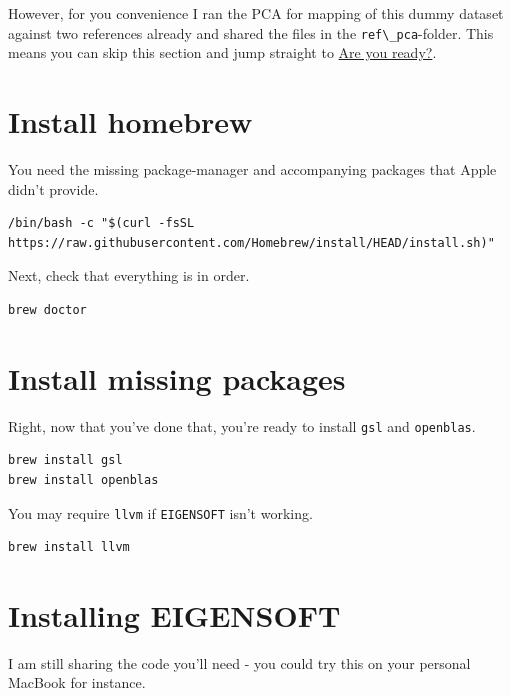 \documentclass[
]{book}
\newcommand{\passthrough}[1]{#1}
\begin{document}
However, for you convenience I ran the PCA for mapping of this dummy dataset against two references already and shared the files in the \passthrough{\lstinline!ref\_pca!}-folder. This means you can skip this section and jump straight to \protect\hyperlink{are-you-ready}{Are you ready?}.

\hypertarget{install-homebrew}{%
\section{Install homebrew}\label{install-homebrew}}

You need the missing package-manager and accompanying packages that Apple didn't provide.

\begin{lstlisting}
/bin/bash -c "$(curl -fsSL https://raw.githubusercontent.com/Homebrew/install/HEAD/install.sh)"
\end{lstlisting}

Next, check that everything is in order.

\begin{lstlisting}
brew doctor
\end{lstlisting}

\hypertarget{install-missing-packages}{%
\section{Install missing packages}\label{install-missing-packages}}

Right, now that you've done that, you're ready to install \passthrough{\lstinline!gsl!} and \passthrough{\lstinline!openblas!}.

\begin{lstlisting}
brew install gsl
brew install openblas
\end{lstlisting}

You may require \passthrough{\lstinline!llvm!} if \passthrough{\lstinline!EIGENSOFT!} isn't working.

\begin{lstlisting}
brew install llvm
\end{lstlisting}

\hypertarget{installing-eigensoft}{%
\section{Installing EIGENSOFT}\label{installing-eigensoft}}

I am still sharing the code you'll need - you could try this on your personal MacBook for instance.
\end{document}
